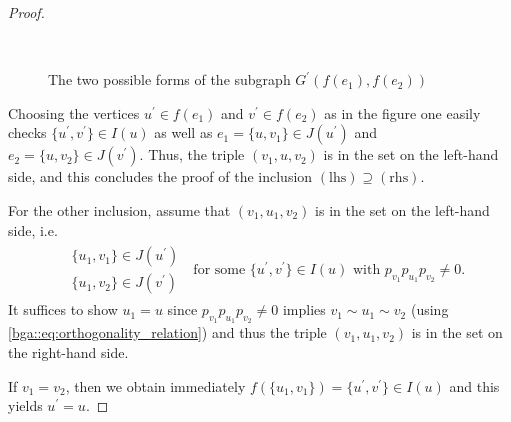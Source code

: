 \documentclass[10pt,a4paper]{amsart}
\begin{document}
\begin{proof}
\begin{figure}[htb]
\begin{tikzpicture}
        \end{tikzpicture}
        $\quad$
        \caption{The two possible forms of the subgraph $G^\prime(f(e_1), f(e_2))$}
        \label{class::fig:G(f(e_1), f(e_2))}
    \end{figure} 
    Choosing the vertices $u^\prime \in f(e_1)$ and $v^\prime \in f(e_2)$ as in the figure one easily checks $\{u^\prime, v^\prime\} \in I(u)$ as well as $e_1 = \{u, v_1\} \in J(u^\prime)$ and $e_2 = \{u, v_2\} \in J(v^\prime)$. Thus, the triple $(v_1, u, v_2)$ is in the set on the left-hand side, and this concludes the proof of the inclusion $(\mathrm{lhs}) \supseteq (\mathrm{rhs})$. 

    For the other inclusion, assume that $(v_1, u_1, v_2)$ is in the set on the left-hand side, i.e.
    \begin{align*}
            \begin{aligned}
                &\{u_1, v_1\} \in J(u^\prime) \\
                &\{u_1, v_2\} \in J(v^\prime)
            \end{aligned} \;
                \text{ for some } \{u^\prime, v^\prime\} \in I(u)
                \text{ with } p_{v_1} p_{u_1} p_{v_2} \neq 0.
    \end{align*}
    It suffices to show $u_1 = u$ since $p_{v_1} p_{u_1} p_{v_2} \neq 0$ implies $v_1 \sim u_1 \sim v_2$ (using \eqref{bga::eq:orthogonality_relation}) and thus the triple $(v_1, u_1, v_2)$ is in the set on the right-hand side.

    If $v_1 = v_2$, then we obtain immediately $f(\{u_1, v_1\}) = \{u^\prime, v^\prime\} \in I(u)$ and this yields $u^\prime = u$. 


\end{proof}
\end{document}
